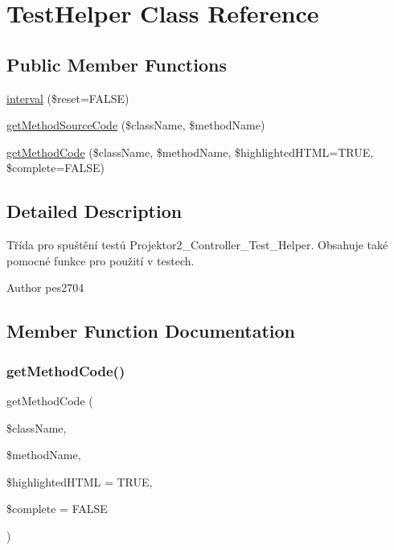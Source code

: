 \hypertarget{class_helper_1_1_test_helper}{}\section{Test\+Helper Class Reference}
\label{class_helper_1_1_test_helper}
\subsection*{Public Member Functions}
\begin{DoxyCompactItemize}
\item 
\mbox{\hyperlink{class_helper_1_1_test_helper_aa80871699b43fe3a4ae7b980c5872451}{interval}} (\$reset=F\+A\+L\+SE)
\item 
\mbox{\hyperlink{class_helper_1_1_test_helper_adc4fe1f0937a02b8401dde9186fa730f}{get\+Method\+Source\+Code}} (\$class\+Name, \$method\+Name)
\item 
\mbox{\hyperlink{class_helper_1_1_test_helper_aa89d814c8bd469bdcd7f65cba32e9917}{get\+Method\+Code}} (\$class\+Name, \$method\+Name, \$highlighted\+H\+T\+ML=T\+R\+UE, \$complete=F\+A\+L\+SE)
\end{DoxyCompactItemize}


\subsection{Detailed Description}
Třída pro spuštění testů Projektor2\+\_\+\+Controller\+\_\+\+Test\+\_\+\+Helper. Obsahuje také pomocné funkce pro použití v testech.

\begin{DoxyAuthor}{Author}
pes2704 
\end{DoxyAuthor}


\subsection{Member Function Documentation}
\mbox{\label{class_helper_1_1_test_helper_aa89d814c8bd469bdcd7f65cba32e9917}} 
\subsubsection{\texorpdfstring{get\+Method\+Code()}{getMethodCode()}}
{\footnotesize\ttfamily get\+Method\+Code (\begin{DoxyParamCaption}\item[{}]{\$class\+Name,  }\item[{}]{\$method\+Name,  }\item[{}]{\$highlighted\+H\+T\+ML = {\ttfamily TRUE},  }\item[{}]{\$complete = {\ttfamily FALSE} }\end{DoxyParamCaption})}

